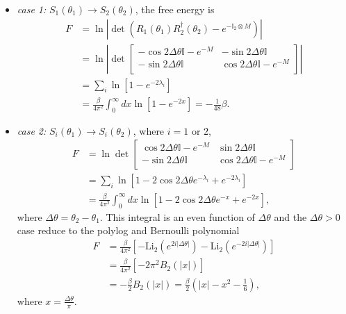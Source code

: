 \begin{itemize}
\item {\it case 1: }$S_1( \theta_1 ) \rightarrow S_2 ( \theta_2 ) $, the free energy is
\begin{equation}
\begin{aligned}
F & = \ln |\det ( R_1( \theta_1 )  R_2^{\dagger}( \theta_2 )  - e^{- \mathbb{I}_2 \otimes M} )| \\
  & = \ln \left| \det
\begin{bmatrix}
-\cos 2 \Delta \theta \mathbb{I} - e^{-M}   & -\sin 2 \Delta \theta \mathbb{I}\\
- \sin 2\Delta \theta \mathbb{I}  &   \cos 2 \Delta \theta \mathbb{I} - e^{-M} \\ 
\end{bmatrix} \right| \\
& = \sum_i \ln [ 1 -  e^{- 2 \lambda_i }  ] \\
& = \frac{\beta}{4\pi^2} \int_0^{\infty} dx \ln [ 1 - e^{-2x} ]  = - \frac{1}{48 }\beta .
\end{aligned}
\end{equation}
\item {\it case 2:} $S_i( \theta_1 ) \rightarrow S_i( \theta_2 )$, where $i = 1 $ or $ 2$, 
\begin{equation}
\begin{aligned}
F & = \ln \det 
\begin{bmatrix}
\cos 2 \Delta \theta \mathbb{I} - e^{-M}   & \sin 2 \Delta \theta \mathbb{I}\\
- \sin 2\Delta \theta \mathbb{I}  &   \cos 2 \Delta \theta \mathbb{I} - e^{-M} \\ 
\end{bmatrix} \\
& = \sum_i \ln [ 1 - 2 \cos 2 \Delta \theta e^{- \lambda_i } + e^{- 2 \lambda_i }  ] \\
& = \frac{\beta}{4\pi^2} \int_0^{\infty} dx \ln [ 1 - 2 \cos 2 \Delta \theta e^{-x} + e^{-2x} ] ,
\end{aligned}
\end{equation}
where $\Delta \theta = \theta_2 - \theta_1$. This integral is an even function of $\Delta \theta$ and the $\Delta \theta > 0$ case reduce to the polylog and Bernoulli polynomial
\begin{equation}
\begin{aligned}
  F &= \frac{\beta}{4\pi^2} \left[ - \text{Li}_2 ( e^{2i |\Delta \theta|} ) - \text{Li}_2 ( e^{- 2i |\Delta \theta|} ) \right] \\
  & = \frac{\beta}{4\pi^2}  \left[ - 2\pi^2 B_2 (|x|) \right] \\
  &= - \frac{\beta}{2} B_2( |x| )  = \frac{\beta}{2} (| x| - x^2 - \frac{1}{6} ),
\end{aligned}
\end{equation}
where $x = \frac{\Delta \theta}{ \pi}$. 
\end{itemize}




